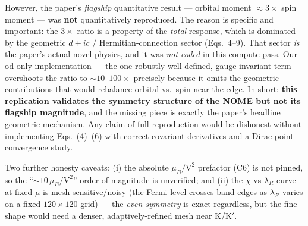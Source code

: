 \documentclass[11pt]{article}
\newcommand{\lamR}{\lambda_{R}}
\newcommand{\muB}{\mu_{B}}
\begin{document}
However, the paper's \emph{flagship} quantitative result --- orbital
moment $\approx 3\times$ spin moment --- was \textbf{not} quantitatively
reproduced. The reason is specific and important: the $3\times$ ratio is a
property of the \emph{total} response, which is dominated by the geometric
$d+ic$ / Hermitian-connection sector (Eqs.~4--9). That sector \emph{is}
the paper's actual novel physics, and it was \emph{not coded} in this
compute pass. Our od-only implementation --- the one robustly
well-defined, gauge-invariant term --- overshoots the ratio to
$\sim\!10$--$100\times$ precisely because it omits the geometric
contributions that would rebalance orbital vs.\ spin near the edge. In
short: \textbf{this replication validates the symmetry structure of the
NOME but not its flagship magnitude}, and the missing piece is exactly the
paper's headline geometric mechanism. Any claim of full reproduction would
be dishonest without implementing Eqs.~(4)--(6) with correct covariant
derivatives and a Dirac-point convergence study.

Two further honesty caveats: (i) the absolute $\muB/\mathrm{V}^2$
prefactor (C6) is not pinned, so the ``$\sim\!10\,\muB/\mathrm{V}^2$''
order-of-magnitude is unverified; and (ii) the $\chi$-vs-$\lamR$ curve at
fixed $\mu$ is mesh-sensitive/noisy (the Fermi level crosses band edges as
$\lamR$ varies on a fixed $120\times120$ grid) --- the \emph{even
symmetry} is exact regardless, but the fine shape would need a denser,
adaptively-refined mesh near K/K$'$.
\end{document}
